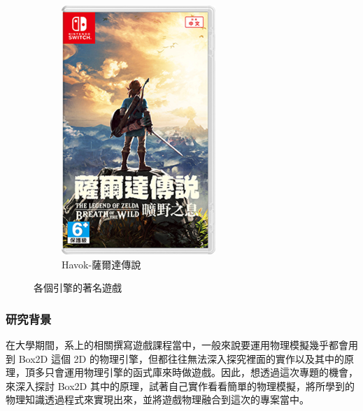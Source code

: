 \begin{figure}[h]
\begin{subfigure}[b]{0.24\linewidth}
    \includegraphics[width=\linewidth]{./resources/physics/havok(3).png}
    \caption{Havok-薩爾達傳說}
    \end{subfigure}
\caption{各個引擎的著名遊戲}
\label{fig:Common_game}
\end{figure}


\subsubsection{研究背景}

在大學期間，系上的相關撰寫遊戲課程當中，一般來說要運用物理模擬幾乎都會用到 Box2D 這個 2D 的物理引擎，但都往往無法深入探究裡面的實作以及其中的原理，頂多只會運用物理引擎的函式庫來時做遊戲。因此，想透過這次專題的機會，來深入探討 Box2D 其中的原理，試著自己實作看看簡單的物理模擬，將所學到的物理知識透過程式來實現出來，並將遊戲物理融合到這次的專案當中。

